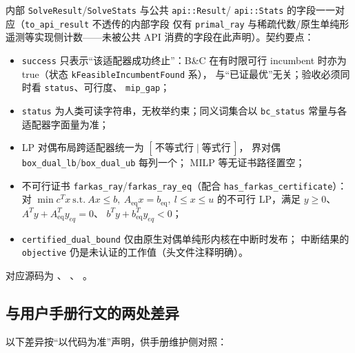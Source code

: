 内部 \texttt{SolveResult}/\texttt{SolveStats} 与公共 \texttt{api::Result}/%
\texttt{api::Stats} 的字段一一对应（\texttt{to\_api\_result} 不透传的内部字段
仅有 \texttt{primal\_ray} 与稀疏代数/原生单纯形遥测等实现侧计数——未被公共
API 消费的字段在此声明）。契约要点：
\begin{itemize}
  \item \texttt{success} 只表示``该适配器成功终止''：B\&C 在有时限可行
        incumbent 时亦为 true（状态 \texttt{kFeasibleIncumbentFound} 系），
        与``已证最优''无关；验收必须同时看 \texttt{status}、可行度、
        \texttt{mip\_gap}；
  \item \texttt{status} 为人类可读字符串，无枚举约束；同义词集合以
        \texttt{bc\_status} 常量与各适配器字面量为准；
  \item LP 对偶布局跨适配器统一为 $[\,\text{不等式行}\;|\;\text{等式行}\,]$，
        界对偶 \texttt{box\_dual\_lb}/\texttt{box\_dual\_ub} 每列一个；
        MILP 等无证书路径置空；
  \item 不可行证书 \texttt{farkas\_ray}/\texttt{farkas\_ray\_eq}（配合
        \texttt{has\_farkas\_certificate}）：对
        $\min c^Tx\ \mathrm{s.t.}\ Ax\le b,\ A_{\mathrm{eq}}x=b_{\mathrm{eq}},\
        l\le x\le u$ 的不可行 LP，满足 $y\ge0$、$A^Ty+A_{\mathrm{eq}}^Ty_{eq}=0$、
        $b^Ty+b_{\mathrm{eq}}^Ty_{eq}<0$；
  \item \texttt{certified\_dual\_bound} 仅由原生对偶单纯形内核在中断时发布；
        中断结果的 \texttt{objective} 仍是未认证的工作值（头文件注释明确）。
\end{itemize}
对应源码为
、
、
。

\subsection{与用户手册行文的两处差异}\label{subsec:api-docdiff}

以下差异按``以代码为准''声明，供手册维护侧对照：

